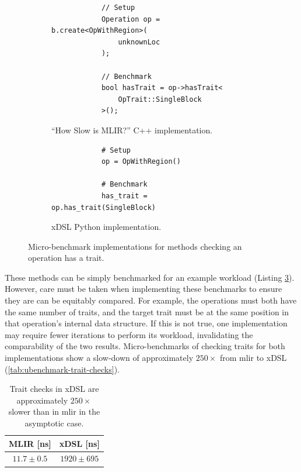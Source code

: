 \begin{figure}[H]
    \centering
    \begin{subfigure}[b]{0.45\textwidth}
       \centering
        \begin{verbatim}
            // Setup
            Operation op = b.create<OpWithRegion>(
                unknownLoc
            );

            // Benchmark
            bool hasTrait = op->hasTrait<
                OpTrait::SingleBlock
            >();
        \end{verbatim}
        \caption{``How Slow is MLIR?'' C++ implementation.}
        \label{listing:ubenchmark-trait-checks-bench-mlir}
    \end{subfigure}
    \hfill
    \begin{subfigure}[b]{0.45\textwidth}
        \centering
        \begin{verbatim}
            # Setup
            op = OpWithRegion()

            # Benchmark
            has_trait = op.has_trait(SingleBlock)
        \end{verbatim}
        \footnotesize\vspace{2em}
        \caption{xDSL Python implementation.}
        \label{listing:ubenchmark-trait-checks-bench-xdsl}
    \end{subfigure}
    \vspace{1em}
    \captionsetup{name=Listing}
    \caption{Micro-benchmark implementations for methods checking an operation has a trait.}
    \label{listing:ubenchmark-trait-checks-bench}
\end{figure}

These methods can be simply benchmarked for an example workload (Listing \ref{listing:ubenchmark-trait-checks-bench}).
However, care must be taken when implementing these benchmarks to ensure they are can be equitably compared. For example, the operations must both have the same number of traits, and the target trait must be at the same position in that operation's internal data structure.
If this is not true, one implementation may require fewer iterations to perform its workload, invalidating the comparability of the two results.
Micro-benchmarks of checking traits for both implementations show a slow-down of approximately $250\times$ from \ac{mlir} to xDSL (\autoref{tab:ubenchmark-trait-checks}).

\begin{table}[H]
  \caption{Trait checks in xDSL are approximately $250\times$ slower than in \ac{mlir} in the asymptotic case.}
  \label{tab:ubenchmark-trait-checks}
  \centering
  \begin{tabular}{cc}
    \toprule
    \textbf{MLIR [ns]} & \textbf{xDSL [ns]}\\
    \midrule
    $11.7 \pm 0.5$ & $1920 \pm 695$ \\
    \bottomrule
  \end{tabular}
\end{table}


